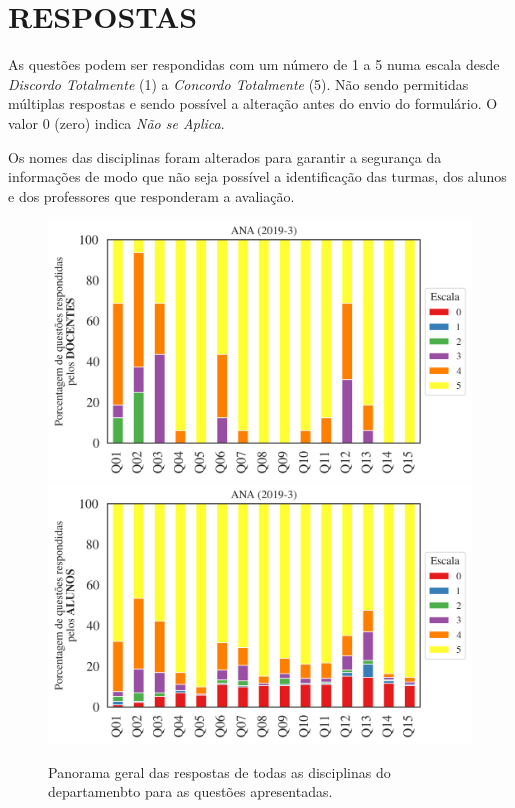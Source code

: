 \documentclass[a4paper,10pt]{article}
\begin{document}
\section{RESPOSTAS}
As questões podem ser respondidas com um número de 1 a 5 numa escala desde {\it Discordo Totalmente} (1) a {\it Concordo Totalmente} (5). Não sendo permitidas múltiplas respostas e sendo possível a alteração antes do envio do formulário. O valor 0 (zero) indica {\it Não se Aplica}.

Os nomes das disciplinas foram alterados para garantir a segurança da informações de modo que não seja possível a identificação das turmas, dos alunos  e dos professores que responderam a avaliação.

\begin{figure}[h]
\centering
\includegraphics[width=0.85\linewidth]{analise_geral_departamento_ANA_docentes.png}
\includegraphics[width=0.85\linewidth]{analise_geral_departamento_ANA_alunos.png}
\caption{\label{fig:analise_geral_departamento}            Panorama geral das respostas de todas as  disciplinas do departamenbto para as questões apresentadas.}
\end{figure}
\end{document}
